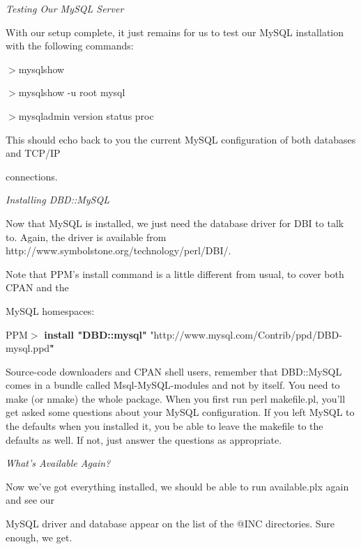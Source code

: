 \documentclass[a4paper,11pt]{book}
\begin{document}
\noindent 

\noindent \textit{Testing Our MySQL Server}

\noindent With our setup complete, it just remains for us to test our MySQL installation with the following commands:

\noindent 

\noindent $>$mysqlshow

\noindent $>$mysqlshow -u root mysql

\noindent $>$mysqladmin version status proc

\noindent 

\noindent This  should echo  back to  you  the  current  MySQL  configuration  of  both  databases  and TCP/IP

\noindent connections.

\noindent 

\noindent \textit{Installing DBD::MySQL}

\noindent Now  that MySQL is installed, we just need the database driver for DBI to talk to. Again, the driver is available from http://www.symbolstone.org/technology/perl/DBI/.

\noindent 

\noindent Note that PPM's  install command  is  a  little  different  from  usual,  to  cover  both  CPAN  and  the

\noindent MySQL homespaces:

\noindent 

\noindent PPM$>$ \textbf{install "DBD::mysql" }"http://www.mysql.com/Contrib/ppd/DBD-mysql.ppd\textbf{"}

\noindent 

\noindent Source-code downloaders and CPAN shell users, remember that DBD::MySQL comes in a bundle called Msql-MySQL-modules and not by itself. You need to make (or nmake) the whole package. When you first run perl makefile.pl, you'll get asked some questions about your MySQL configuration. If you left MySQL to the defaults when you installed it, you be able to leave the makefile to the defaults as well. If not, just answer the questions as appropriate.

\noindent 

\noindent 

\noindent \textit{What's Available Again?}

\noindent Now we've got everything installed, we should be able to run available.plx again and see our

\noindent MySQL driver and database appear on the list of the @INC directories. Sure enough, we get.
\end{document}
